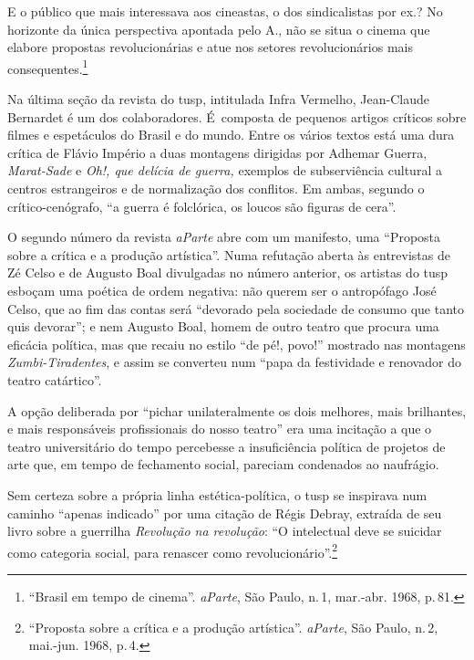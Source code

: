 \startblockquote
E o público que mais interessava aos cineastas, o dos sindicalistas por
ex.? No horizonte da única perspectiva apontada pelo A., não se situa o
cinema que elabore propostas revolucionárias e atue nos setores
revolucionários mais consequentes.\footnote{“Brasil em tempo de cinema”.
  {\it aParte}, São Paulo, n.\,1, mar.-abr. 1968, p.\,81.}
\stopblockquote

Na última seção da revista do {\sc tusp}, intitulada Infra Vermelho,
Jean-Claude Bernardet é um dos colaboradores. É~composta de pequenos
artigos críticos sobre filmes e espetáculos do Brasil e do mundo. Entre
os vários textos está uma dura crítica de Flávio Império a duas
montagens dirigidas por Adhemar Guerra, {\it Marat-Sade} e {\it Oh!, que
delícia de guerra,} exemplos de subserviência cultural a centros
estrangeiros e de normalização dos conflitos. Em ambas, segundo
o crítico-cenógrafo, “a guerra é folclórica, os loucos são figuras de
cera”.


O segundo número da revista {\it aParte} abre com um manifesto, uma
“Proposta sobre a crítica e a produção artística”. Numa refutação
aberta às entrevistas de Zé Celso e de Augusto Boal divulgadas no número
anterior, os artistas do {\sc tusp} esboçam uma poética de ordem negativa: não
querem ser o antropófago José Celso, que ao fim das contas será
“devorado pela sociedade de consumo que tanto quis devorar”; e nem
Augusto Boal, homem de outro teatro que procura uma eficácia política,
mas que recaiu no estilo “de pé!, povo!” mostrado nas montagens
{\it Zumbi-Tiradentes}, e assim se converteu num “papa da festividade e
renovador do teatro catártico”.

A opção deliberada por “pichar unilateralmente os dois melhores, mais
brilhantes, e mais responsáveis profissionais do nosso teatro” era uma
incitação a que o teatro universitário do tempo percebesse a
insuficiência política de projetos de arte que, em tempo de fechamento
social, pareciam condenados ao naufrágio.

Sem certeza sobre a própria linha estética-política, o {\sc tusp} se inspirava
num caminho “apenas indicado” por uma citação de Régis Debray, extraída
de seu livro sobre a guerrilha {\it Revolução na revolução}: “O
intelectual deve se suicidar como categoria social, para renascer como
revolucionário”.\footnote{“Proposta sobre a crítica e a produção
  artística”. {\it aParte}, São Paulo, n.\,2, mai.-jun. 1968, p.\,4.}

